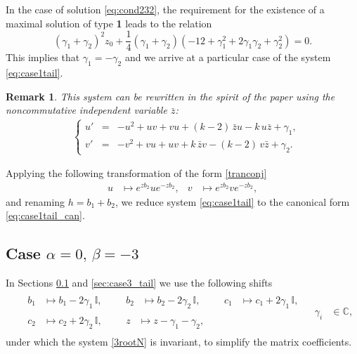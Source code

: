 \documentclass{article}
\theoremstyle{plain}
\newtheorem{remark}{Remark}
\begin{document}
In the case of solution \eqref{eq:cond232}, the requirement for the existence of a maximal solution of type {\bf 1} leads to the relation
$$ (\gamma_1 + \gamma_2)^2 z_0 + \frac{1}{4} (\gamma_1 + \gamma_2) (-12 + \gamma_1^2 + 2 \gamma_1 \gamma_2 + \gamma_2^2) = 0.$$
This implies that $\gamma_1 = - \gamma_2$ and we arrive at a  particular case of the system \eqref{eq:case1tail}.

\begin{remark}
This system can be rewritten in the spirit of the paper
 using the noncommutative independent variable $\bar z$:
\begin{align*}  
    &
    \left\{
    \begin{array}{lcl}
    u'
    &=& - u^2 + u v + v u + (k - 2) \, \bar zu - k\, u \bar z + \gamma_1,
    \\[2mm]
    v'
    &=& - v^2 + v u + u v + k\, \bar z v - (k - 2)\, v \bar z + \gamma_2.
    \end{array}
    \right.
\end{align*}
\end{remark}

Applying the following transformation of the form \eqref{tranconj}
\begin{align*}
    u 
    & \mapsto e^{z b_2} u e^{- z b_2},
    &
    v 
    & \mapsto e^{z b_2} v e^{- z b_2},
\end{align*}
and renaming $h = b_1 + b_2$, we reduce system \eqref{eq:case1tail} to the canonical form \ref{eq:case1tail_can}.

\medskip
\subsection{Case \texorpdfstring{$\alpha = 0,\, \beta =-3$}{alpha = 0, beta = -3}} \label{sec:case5_tail}

In Sections \ref{sec:case5_tail} and \ref{sec:case3_tail}  we  use the following shifts
\begin{align} \label{eq:tailtransform}
    &
    \begin{gathered}
    \begin{aligned}
        b_1 
        &\mapsto b_1 - 2 \gamma_1 \, \mathbb{I},
        &&&
        b_2
        &\mapsto b_2 - 2 \gamma_2 \, \mathbb{I},
        &&&
        c_1
        &\mapsto c_1 + 2 \gamma_1 \, \mathbb{I},
    \end{aligned}
    \\[2mm]
    \begin{aligned}
        c_2
        &\mapsto c_2 + 2 \gamma_2 \, \mathbb{I}, 
        &&&
        z
        &\mapsto z - \gamma_1 - \gamma_2,
    \end{aligned}
    \end{gathered} 
    &
    \gamma_i 
    &\in {\mathbb C},
\end{align}
under which the system \eqref{3rootN} is invariant, to simplify the matrix coefficients.
\end{document}
